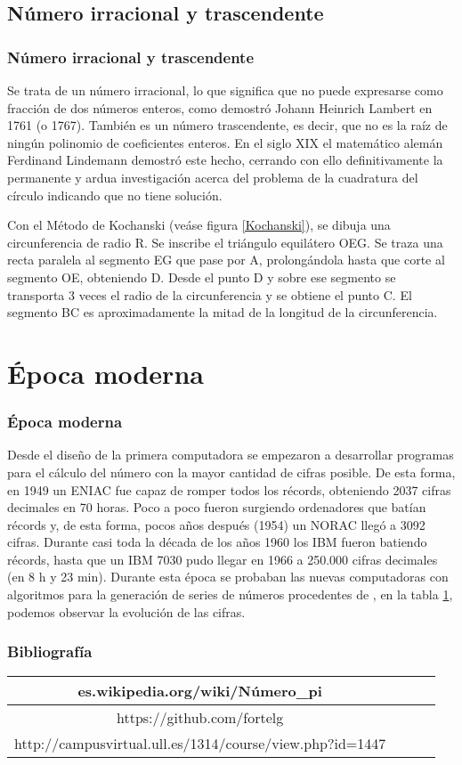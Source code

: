 \documentclass{beamer}
\begin{document}
\subsection{Número irracional y trascendente}
\begin{frame}
\frametitle{Número irracional y trascendente}
Se trata de un número irracional, lo que significa que no puede expresarse como fracción de dos números enteros, como demostró Johann Heinrich Lambert
en 1761 (o 1767). También es un número trascendente, es decir, que no es la raíz de ningún polinomio de coeficientes enteros. En el siglo XIX el matemático
alemán Ferdinand Lindemann demostró este hecho, cerrando con ello definitivamente la permanente y ardua investigación acerca del problema de la cuadratura
del círculo indicando que no tiene solución.

Con el Método de Kochanski (veáse figura \ref{Kochanski}), se dibuja una circunferencia de radio R. Se inscribe el triángulo equilátero OEG. Se traza una
recta paralela al segmento EG que pase por A, prolongándola hasta que corte al segmento OE, obteniendo D. Desde el punto D y sobre ese segmento se transporta
3 veces el radio de la circunferencia y se obtiene el punto C. El segmento BC es aproximadamente la mitad de la longitud de la circunferencia.
\end{frame}


\section{Época moderna}
\begin{frame}
\frametitle{Época moderna}
Desde el diseño de la primera computadora se empezaron a desarrollar programas para el cálculo del número \PI con la mayor cantidad de cifras
posible. De esta forma, en 1949 un ENIAC fue capaz de romper todos los récords, obteniendo 2037 cifras decimales en 70 horas. Poco a poco fueron
surgiendo ordenadores que batían récords y, de esta forma, pocos años después (1954) un NORAC llegó a 3092 cifras. Durante casi toda la década
de los años 1960 los IBM fueron batiendo récords, hasta que un IBM 7030 pudo llegar en 1966 a 250.000 cifras decimales (en 8 h y 23 min).
Durante esta época se probaban las nuevas computadoras con algoritmos para la generación de series de números procedentes de \PI, en la tabla \ref{tiempo},
podemos observar la evolución de las cifras.
\end{frame}

\begin{frame}
\frametitle{Bibliografía}
\begin{table}[!ht]
\begin{center}
\begin{tabular}{|c|l|l|l|}
\hline
es.wikipedia.org/wiki/Número_pi \\ \hline
https://github.com/fortelg\\ \hline
http://campusvirtual.ull.es/1314/course/view.php?id=1447\\ \hline

\end{tabular}
\end{center}
\label{tiempo}
\end{table}
\end{frame}
\end{document}
